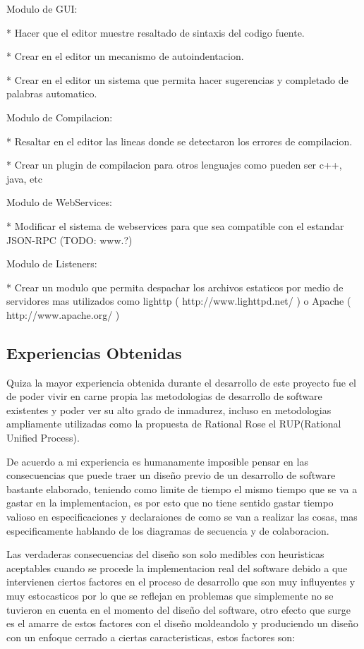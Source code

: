 Modulo de GUI:

* Hacer que el editor muestre resaltado de sintaxis del codigo fuente.

* Crear en el editor un mecanismo de autoindentacion.

* Crear en el editor un sistema que permita hacer sugerencias y completado de palabras automatico.

Modulo de Compilacion:

* Resaltar en el editor las lineas donde se detectaron los errores de compilacion.

* Crear un plugin de compilacion para otros lenguajes como pueden ser c++, java, etc

Modulo de WebServices:

* Modificar el sistema de webservices para que sea compatible con el estandar JSON-RPC (TODO: www.?)

Modulo de Listeners:

* Crear un modulo que permita despachar los archivos estaticos por medio de servidores mas utilizados como lighttp ( http://www.lighttpd.net/ ) o Apache ( http://www.apache.org/ )


\subsection{Experiencias Obtenidas}


Quiza la mayor experiencia obtenida durante el desarrollo de este proyecto fue el de poder vivir en carne propia las metodologias de desarrollo de software existentes y poder ver su alto grado de inmadurez, incluso en metodologias ampliamente utilizadas como la propuesta de Rational Rose el RUP(Rational Unified Process).

De acuerdo a mi experiencia es humanamente imposible pensar en las consecuencias que puede traer un diseño previo de un desarrollo de software bastante elaborado, teniendo como limite de tiempo el mismo tiempo que se va a gastar en la implementacion, es por esto que no tiene sentido gastar tiempo valioso en especificaciones y declaraiones de como se van a realizar las cosas, mas especificamente hablando de los diagramas de secuencia y de colaboracion.

Las verdaderas consecuencias del diseño son solo medibles con heuristicas aceptables cuando se procede la implementacion real del software debido a que intervienen ciertos factores en el proceso de desarrollo que son muy influyentes y muy estocasticos por lo que se reflejan en problemas que simplemente no se tuvieron en cuenta en el momento del diseño del software, otro efecto que surge es el amarre de estos factores con el diseño moldeandolo y produciendo un diseño con un enfoque cerrado a ciertas caracteristicas, estos factores son:

